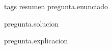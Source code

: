 \begin{preguntasola}{ {{tags}} }{ {{resumen}} }
{{pregunta.enunciado}}

\begin{solucion}
{{pregunta.solucion}}
\end{solucion}

\begin{explicacion}
{{pregunta.explicacion}}
\end{explicacion}

\end{preguntasola}
